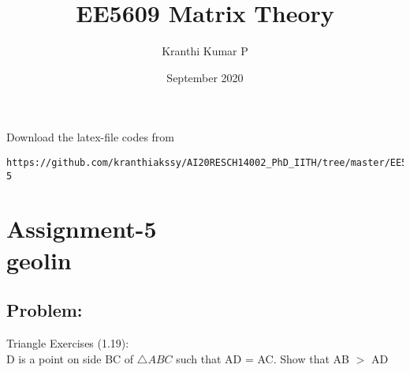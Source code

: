 \documentclass[journal,12pt,twocolumn]{IEEEtran}
\begin{document}
     \def\rightbox#1{\makebox[0in][r]{#1}}
     \def\centbox#1{\makebox[0in]{#1}}
     \def\topbox#1{\raisebox{-\baselineskip}[0in][0in]{#1}}
     \def\midbox#1{\raisebox{-0.5\baselineskip}[0in][0in]{#1}}
\vspace{3cm}
\title{EE5609 Matrix Theory}
\author{Kranthi Kumar P}
\date{September 2020}
\maketitle
\newpage
\bigskip
\renewcommand{\thefigure}{\theenumi}
\renewcommand{\thetable}{\theenumi}
%
Download the latex-file codes from 
%
\begin{lstlisting}
https://github.com/kranthiakssy/AI20RESCH14002_PhD_IITH/tree/master/EE5609_Matrix_Theory/Assignment-5
\end{lstlisting}
\section*{Assignment-5\\geolin}
\subsection*{Problem:}
Triangle Exercises (1.19):\\
D is a point on side BC of $\triangle ABC $ such that AD = AC. Show that AB $>$ AD
\end{document}
